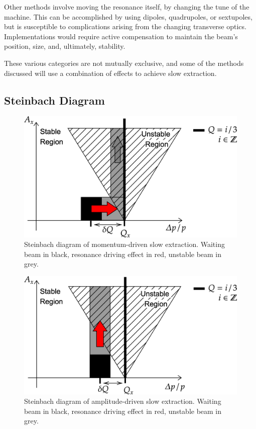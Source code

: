 \documentclass[a4paper,twoside,11pt]{report}
\begin{document}
Other methods involve moving the resonance itself, by changing the tune of the machine. This can be accomplished by using dipoles, quadrupoles, or sextupoles, but is susceptible to complications arising from the changing transverse optics. Implementations would require active compensation to maintain the beam's position, size, and, ultimately, stability.%

These various categories are not mutually exclusive, and some of the methods discussed will use a combination of effects to achieve slow extraction.

\subsection{Steinbach Diagram}\label{sec:steinbach}

\begin{figure}[ht]
  \centering
  \includegraphics[width=0.6\linewidth]{momentum-driven.png}
  \caption[Steinbach diagram of momentum-driven slow extraction]{Steinbach diagram of momentum-driven slow extraction. Waiting beam in black, resonance driving effect in red, unstable beam in grey.}\label{fig:momentum-driven}
\end{figure}

\begin{figure}[ht]
  \centering
  \includegraphics[width=0.6\linewidth]{amplitude-driven.png}
  \caption[Steinbach diagram of amplitude-driven slow extraction]{Steinbach diagram of amplitude-driven slow extraction. Waiting beam in black, resonance driving effect in red, unstable beam in grey.}\label{fig:amplitude-driven}
\end{figure}
\end{document}
